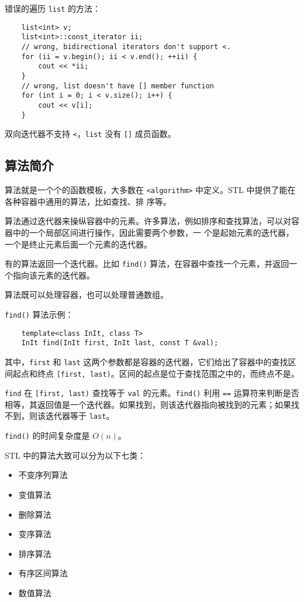 \documentclass[UTF8]{ctexart}
\begin{document}
错误的遍历 \texttt{list} 的方法：
\begin{verbatim}
    list<int> v;
    list<int>::const_iterator ii;
    // wrong, bidirectional iterators don't support <.
    for (ii = v.begin(); ii < v.end(); ++ii) {
        cout << *ii;
    }
    // wrong, list doesn't have [] member function
    for (int i = 0; i < v.size(); i++) {
        cout << v[i];
    }
\end{verbatim}
双向迭代器不支持 \texttt{<}，\texttt{list} 没有 \texttt{[]} 成员函数。

\subsection{算法简介}
算法就是一个个的函数模板，大多数在 \texttt{<algorithm>} 中定义。STL 中提供了能在各种容器中通用的算法，比如查找、排
序等。

算法通过迭代器来操纵容器中的元素。许多算法，例如排序和查找算法，可以对容器中的一个局部区间进行操作，因此需要两个参数，一
个是起始元素的迭代器，一个是终止元素后面一个元素的迭代器。

有的算法返回一个迭代器。比如 \texttt{find()} 算法，在容器中查找一个元素，并返回一个指向该元素的迭代器。

算法既可以处理容器，也可以处理普通数组。

\texttt{find()} 算法示例：
\begin{verbatim}
    template<class InIt, class T>
    InIt find(InIt first, InIt last, const T &val);
\end{verbatim}
其中，\texttt{first} 和 \texttt{last} 这两个参数都是容器的迭代器，它们给出了容器中的查找区间起点和终点
\texttt{[first, last)}。区间的起点是位于查找范围之中的，而终点不是。

\texttt{find} 在 \texttt{[first, last)} 查找等于 \texttt{val} 的元素。\texttt{find()} 利用 \texttt{==}
运算符来判断是否相等，其返回值是一个迭代器。如果找到，则该迭代器指向被找到的元素；如果找不到，则该迭代器等于
\texttt{last}。

\texttt{find()} 的时间复杂度是 $O(n)$。

STL 中的算法大致可以分为以下七类：
\begin{itemize}
    \item 不变序列算法
    \item 变值算法
    \item 删除算法
    \item 变序算法
    \item 排序算法
    \item 有序区间算法
    \item 数值算法
\end{itemize}
\end{document}
